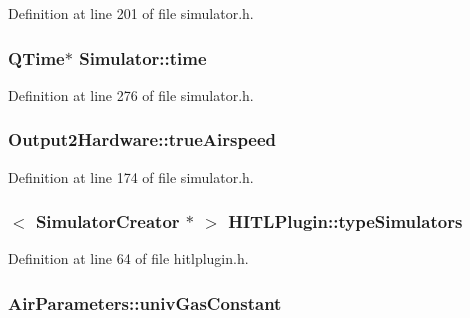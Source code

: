 Definition at line 201 of file simulator.\-h.

\hypertarget{group___h_i_t_l_plugin_ga162228fbfec7737c989bfe0b340e8617}{
\subsubsection[{time}]{\setlength{\rightskip}{0pt plus 5cm}Q\-Time$\ast$ Simulator\-::time\hspace{0.3cm}{\ttfamily [protected]}}}\label{group___h_i_t_l_plugin_ga162228fbfec7737c989bfe0b340e8617}


Definition at line 276 of file simulator.\-h.

\hypertarget{group___h_i_t_l_plugin_gaca71e282fd00490c801905254e99ef54}{
\subsubsection[{true\-Airspeed}]{ Output2\-Hardware\-::true\-Airspeed}}\label{group___h_i_t_l_plugin_gaca71e282fd00490c801905254e99ef54}


Definition at line 174 of file simulator.\-h.

\hypertarget{group___h_i_t_l_plugin_ga0400c2f74f4a0c3cd840f95c99b1b601}{
\subsubsection[{type\-Simulators}]{$<$ {\bf Simulator\-Creator} $\ast$ $>$ H\-I\-T\-L\-Plugin\-::type\-Simulators\hspace{0.3cm}{\ttfamily [static]}}}\label{group___h_i_t_l_plugin_ga0400c2f74f4a0c3cd840f95c99b1b601}


Definition at line 64 of file hitlplugin.\-h.

\hypertarget{group___h_i_t_l_plugin_gaf6cf658bcff6f341c341ba3f6194761c}{
\subsubsection[{univ\-Gas\-Constant}]{ Air\-Parameters\-::univ\-Gas\-Constant}}\label{group___h_i_t_l_plugin_gaf6cf658bcff6f341c341ba3f6194761c}


